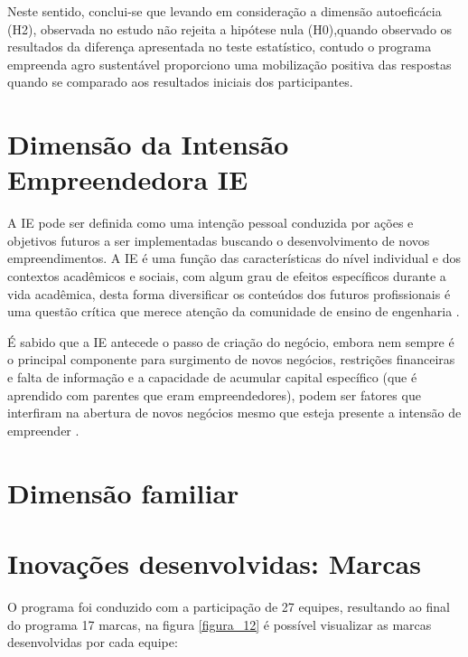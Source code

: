 Neste sentido, conclui-se que levando em consideração a dimensão autoeficácia (H2), observada no estudo não rejeita a hipótese nula (H0),quando observado os resultados da diferença apresentada no teste estatístico, contudo o programa empreenda agro sustentável proporciono uma mobilização positiva das respostas quando se comparado aos resultados iniciais dos participantes.



\section{Dimensão da Intensão Empreendedora IE}

A IE pode ser definida como uma intenção pessoal conduzida por ações e objetivos futuros a ser implementadas buscando o desenvolvimento de novos empreendimentos. A IE é uma função das características do nível individual e dos contextos acadêmicos e sociais, com algum grau de efeitos específicos durante a vida acadêmica, desta forma diversificar os conteúdos dos futuros profissionais é uma questão crítica que merece atenção da comunidade de ensino de engenharia \cite{gilmartin_entrepreneurial_2019}.

É sabido que a IE antecede o passo de criação do negócio, embora nem sempre é o principal componente para surgimento de novos negócios, restrições financeiras e falta de informação e a capacidade de acumular capital específico (que é aprendido com parentes que eram empreendedores), podem ser fatores que interfiram na abertura de novos negócios mesmo que esteja presente a intensão de empreender \cite{auguste_what_2016}.


\section{Dimensão familiar}

\section{Inovações desenvolvidas: Marcas}

O programa foi conduzido com a participação de 27 equipes, resultando ao final do programa  17 marcas, na figura \ref{figura_12} é possível visualizar as marcas desenvolvidas por cada equipe: 

